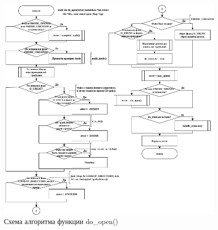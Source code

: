 \begin{figure}[H]
	\centering
	\includegraphics[scale=0.6]{assets/lab06-do_open.drawio.png}
	\caption{Схема алгоритма функции do\_open()}
\end{figure}

